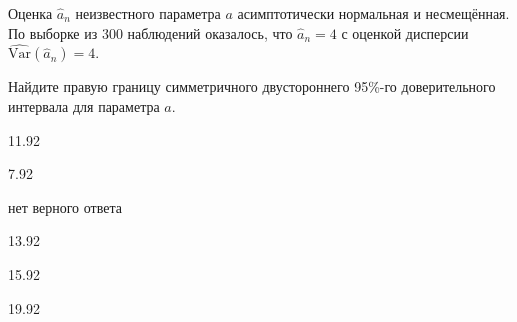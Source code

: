 
\begin{question}
Оценка \(\hat a_n\) неизвестного параметра \(a\) асимптотически
нормальная и несмещённая. По выборке из 300 наблюдений оказалось, что
\(\hat a_n = 4\) с оценкой дисперсии
\(\widehat{\mathrm{Var}}(\hat a_n) = 4\).

Найдите правую границу симметричного двустороннего 95\%-го
доверительного интервала для параметра \(a\).
\begin{answerlist}
  \item 11.92
  \item 7.92
  \item нет верного ответа
  \item 13.92
  \item 15.92
  \item 19.92
\end{answerlist}
\end{question}


